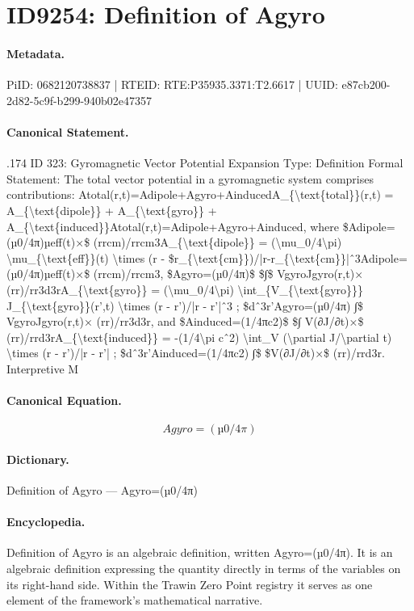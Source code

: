 \section*{ID9254: Definition of Agyro}
\paragraph{Metadata.}
PiID: 0682120738837 | RTEID: RTE:P35935.3371:T2.6617 | UUID: e87cb200-2d82-5c9f-b299-940b02e47357

\paragraph{Canonical Statement.}
.174 ID 323: Gyromagnetic Vector Potential Expansion Type: Definition Formal Statement: The total vector potential in a gyromagnetic system comprises contributions: Atotal(r,t)=Adipole+Agyro+AinducedA\_\{\textbackslash{}text\{total\}\}(r,t) = A\_\{\textbackslash{}text\{dipole\}\} + A\_\{\textbackslash{}text\{gyro\}\} + A\_\{\textbackslash{}text\{induced\}\}Atotal(r,t)=Adipole+Agyro+Ainduced, where \$Adipole=(µ0/4π)µeff(t)×\$ (rrcm)/rrcm3A\_\{\textbackslash{}text\{dipole\}\} = (\textbackslash{}mu\_0/4\textbackslash{}pi) \textbackslash{}mu\_\{\textbackslash{}text\{eff\}\}(t) \textbackslash{}times (r - \$r\_\{\textbackslash{}text\{cm\}\})/|r-r\_\{\textbackslash{}text\{cm\}\}|ˆ3Adipole=(µ0/4π)µeff(t)×\$ (rrcm)/rrcm3, \$Agyro=(µ0/4π)\$ \$∫\$ VgyroJgyro(r,t)× (rr)/rr3d3rA\_\{\textbackslash{}text\{gyro\}\} = (\textbackslash{}mu\_0/4\textbackslash{}pi) \textbackslash{}int\_\{V\_\{\textbackslash{}text\{gyro\}\}\} J\_\{\textbackslash{}text\{gyro\}\}(r’,t) \textbackslash{}times (r - r’)/|r - r’|ˆ3 ; \$dˆ3r’Agyro=(µ0/4π) ∫\$ VgyroJgyro(r,t)× (rr)/rr3d3r, and \$Ainduced=(1/4πc2)\$ \$∫ V(∂J/∂t)×\$ (rr)/rrd3rA\_\{\textbackslash{}text\{induced\}\} = -(1/4\textbackslash{}pi cˆ2) \textbackslash{}int\_V (\textbackslash{}partial J/\textbackslash{}partial t) \textbackslash{}times (r - r’)/|r - r’| ; \$dˆ3r’Ainduced=(1/4πc2) ∫\$ \$V(∂J/∂t)×\$ (rr)/rrd3r. Interpretive M

\paragraph{Canonical Equation.}
\[
Agyro=(µ0/4π)
\]

\paragraph{Dictionary.}
Definition of Agyro — Agyro=(µ0/4π)

\paragraph{Encyclopedia.}
Definition of Agyro is an algebraic definition, written Agyro=(µ0/4π). It is an algebraic definition expressing the quantity directly in terms of the variables on its right-hand side. Within the Trawin Zero Point registry it serves as one element of the framework's mathematical narrative.

